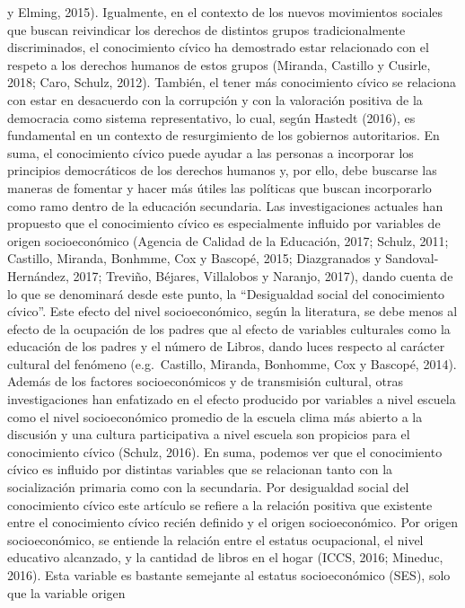 \documentclass[
]{article}
\begin{document}
y Elming, 2015). Igualmente, en el contexto de los nuevos movimientos
sociales que buscan reivindicar los derechos de distintos grupos
tradicionalmente discriminados, el conocimiento cívico ha demostrado
estar relacionado con el respeto a los derechos humanos de estos grupos
(Miranda, Castillo y Cusirle, 2018; Caro, Schulz, 2012). También, el
tener más conocimiento cívico se relaciona con estar en desacuerdo con
la corrupción y con la valoración positiva de la democracia como sistema
representativo, lo cual, según Hastedt (2016), es fundamental en un
contexto de resurgimiento de los gobiernos autoritarios. En suma, el
conocimiento cívico puede ayudar a las personas a incorporar los
principios democráticos de los derechos humanos y, por ello, debe
buscarse las maneras de fomentar y hacer más útiles las políticas que
buscan incorporarlo como ramo dentro de la educación secundaria. Las
investigaciones actuales han propuesto que el conocimiento cívico es
especialmente influido por variables de origen socioeconómico (Agencia
de Calidad de la Educación, 2017; Schulz, 2011; Castillo, Miranda,
Bonhmme, Cox y Bascopé, 2015; Diazgranados y Sandoval-Hernández, 2017;
Treviño, Béjares, Villalobos y Naranjo, 2017), dando cuenta de lo que se
denominará desde este punto, la ``Desigualdad social del conocimiento
cívico''. Este efecto del nivel socioeconómico, según la literatura, se
debe menos al efecto de la ocupación de los padres que al efecto de
variables culturales como la educación de los padres y el número de
Libros, dando luces respecto al carácter cultural del fenómeno
(e.g.~Castillo, Miranda, Bonhomme, Cox y Bascopé, 2014). Además de los
factores socioeconómicos y de transmisión cultural, otras
investigaciones han enfatizado en el efecto producido por variables a
nivel escuela como el nivel socioeconómico promedio de la escuela clima
más abierto a la discusión y una cultura participativa a nivel escuela
son propicios para el conocimiento cívico (Schulz, 2016). En suma,
podemos ver que el conocimiento cívico es influido por distintas
variables que se relacionan tanto con la socialización primaria como con
la secundaria. Por desigualdad social del conocimiento cívico este
artículo se refiere a la relación positiva que existente entre el
conocimiento cívico recién definido y el origen socioeconómico. Por
origen socioeconómico, se entiende la relación entre el estatus
ocupacional, el nivel educativo alcanzado, y la cantidad de libros en el
hogar (ICCS, 2016; Mineduc, 2016). Esta variable es bastante semejante
al estatus socioeconómico (SES), solo que la variable origen
\end{document}
